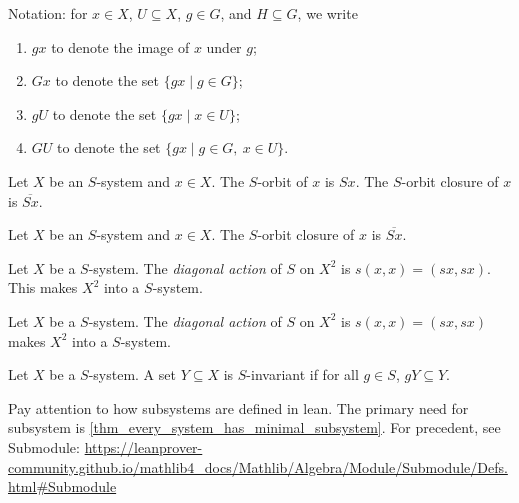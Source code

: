 Notation: for $x \in X$, $U \subseteq X$, $g \in G$, and $H \subseteq G$, we write
\begin{enumerate}
    \item $gx$ to denote the image of $x$ under $g$;
    
    \item $Gx$ to denote the set $\{gx \mid g \in G\}$;

    \item $gU$ to denote the set $\{g x \mid x \in U\}$;

    \item $GU$ to denote the set $\{gx \mid g \in G, \ x \in U\}$.
\end{enumerate}

\begin{definition}[Orbit]
\leanok{}
    Let $X$ be an $S$-system and $x \in X$.  The $S$-orbit of $x$ is $Sx$.  The $S$-orbit closure of $x$ is $\overline{Sx}$.
\end{definition}

\begin{definition}
\leanok{}
    Let $X$ be an $S$-system and $x \in X$.  The $S$-orbit closure of $x$ is $\overline{Sx}$.
\end{definition}

\begin{definition}
\leanok{}
    Let $X$ be a $S$-system.  The \emph{diagonal action} of $S$ on $X^2$ is $s(x,x) = (sx,sx)$.  This makes $X^2$ into a $S$-system.
\end{definition}

\begin{definition}
\leanok{}
    Let $X$ be a $S$-system.  The \emph{diagonal action} of $S$ on $X^2$ is $s(x,x) = (sx,sx)$ makes $X^2$ into a $S$-system.
\end{definition}

\begin{definition}
\leanok{}
    Let $X$ be a $S$-system.  A set $Y \subseteq X$ is $S$-invariant if for all $g \in S$, $gY \subseteq Y$.
\end{definition}

\begin{leanrmk}
    Pay attention to how subsystems are defined in lean.  The primary need for subsystem is \cref{thm_every_system_has_minimal_subsystem}.  For precedent, see Submodule: \url{https://leanprover-community.github.io/mathlib4_docs/Mathlib/Algebra/Module/Submodule/Defs.html#Submodule}
\end{leanrmk}

